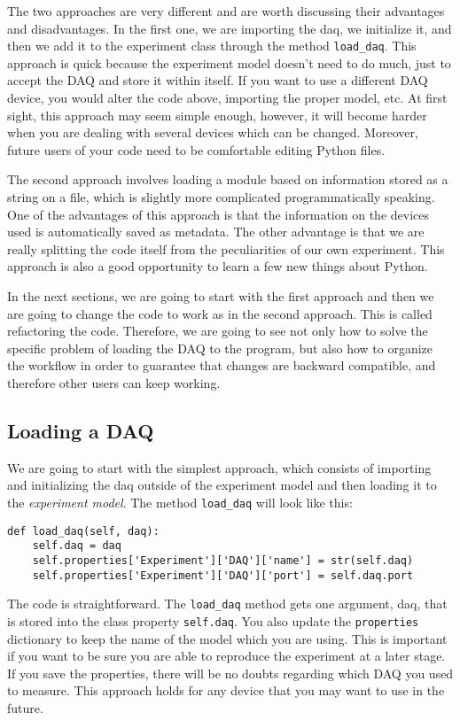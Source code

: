The two approaches are very different and are worth discussing their advantages and disadvantages. In the first one, we are
importing the daq, we initialize it, and then we add it to the experiment class through the method \texttt{load\_daq}. This approach is quick because the experiment model doesn't need to do much, just to accept the DAQ and store it within itself. If you want to use a different DAQ device, you would alter the code above, importing the proper model, etc. At first sight, this approach may seem simple enough, however, it will become harder when you are dealing with several devices which can be changed. Moreover, future users of your code need to be comfortable editing Python files. 

The second approach involves loading a module based on information stored as a string on a file, which is slightly more complicated programmatically speaking. One of the advantages of this approach is that the information on the devices used is automatically saved as metadata. The other advantage is that we are really splitting the code itself from the peculiarities of our own experiment. This approach is also a good opportunity to learn a few new things about Python. 

In the next sections, we are going to start with the first approach and then we are going to change the code to work as in the second approach. This is called refactoring the code. Therefore, we are going to see not only how to solve the specific problem of loading the DAQ to the program, but also how to organize the workflow in order to guarantee that changes are backward compatible, and therefore other users can keep working. 

\subsection{Loading a DAQ}\label{loading-a-daq}
We are going to start with the simplest approach, which consists of importing and initializing the daq outside of the experiment model and then loading it to the \emph{experiment model}. The method \texttt{load_daq} will look like this:

\begin{verbatim}
def load_daq(self, daq):
    self.daq = daq
    self.properties['Experiment']['DAQ']['name'] = str(self.daq)
    self.properties['Experiment']['DAQ']['port'] = self.daq.port
\end{verbatim}

The code is straightforward. The \texttt{load_daq} method gets one
argument, daq, that is stored into the class property \texttt{self.daq}.
You also update the \texttt{properties} dictionary to keep the name of
the model which you are using. This is important if you want to be sure you are able to reproduce the experiment at a later stage. If you save the properties, there will be no doubts regarding which DAQ you used to measure. This approach holds for any device that you may want to use in the future. 

